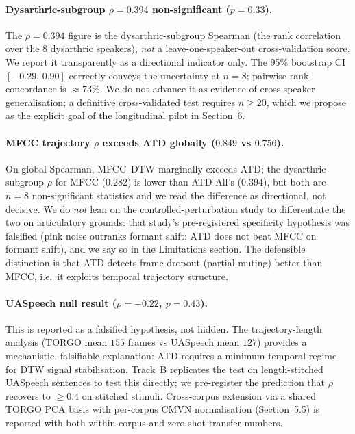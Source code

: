 
\paragraph{Dysarthric-subgroup $\rho = 0.394$ non-significant ($p = 0.33$).}
The $\rho = 0.394$ figure is the dysarthric-subgroup Spearman (the rank
correlation over the 8 dysarthric speakers), \emph{not} a
leave-one-speaker-out cross-validation score. We report it transparently
as a directional indicator only. The 95\% bootstrap CI $[-0.29,\,0.90]$
correctly conveys the uncertainty at $n = 8$; pairwise rank concordance is
$\approx 73\%$. We do not advance it as evidence of cross-speaker
generalisation; a definitive cross-validated test requires $n \geq 20$,
which we propose as the explicit goal of the longitudinal pilot in
Section~6.

\paragraph{MFCC trajectory $\rho$ exceeds ATD globally ($0.849$ vs $0.756$).}
On global Spearman, MFCC--DTW marginally exceeds ATD; the
dysarthric-subgroup $\rho$ for MFCC ($0.282$) is lower than ATD-All's
($0.394$), but both are $n = 8$ non-significant statistics and we read the
difference as directional, not decisive. We do \emph{not} lean on the
controlled-perturbation study to differentiate the two on articulatory
grounds: that study's pre-registered specificity hypothesis was falsified
(pink noise outranks formant shift; ATD does not beat MFCC on formant
shift), and we say so in the Limitations section. The defensible
distinction is that ATD detects frame dropout (partial muting) better than
MFCC, i.e.\ it exploits temporal trajectory structure.

\paragraph{UASpeech null result ($\rho = -0.22$, $p = 0.43$).}
This is reported as a falsified hypothesis, not hidden. The
trajectory-length analysis (TORGO mean $155$ frames vs UASpeech mean $127$)
provides a mechanistic, falsifiable explanation: ATD requires a minimum
temporal regime for DTW signal stabilisation. Track~B replicates the test
on length-stitched UASpeech sentences to test this directly; we
pre-register the prediction that $\rho$ recovers to $\geq 0.4$ on stitched
stimuli. Cross-corpus extension via a shared TORGO PCA basis with
per-corpus CMVN normalisation (Section~5.5) is reported with both
within-corpus and zero-shot transfer numbers.

